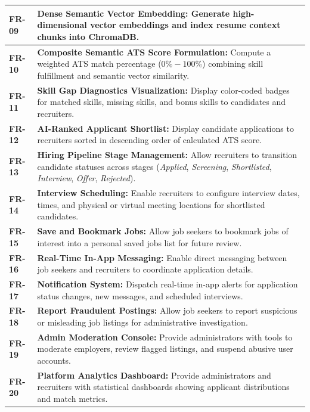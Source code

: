 \begin{table}[H]
\begin{tabular}{|l|p{12cm}|}
\textbf{FR-09} & \textbf{Dense Semantic Vector Embedding:} Generate high-dimensional vector embeddings and index resume context chunks into ChromaDB. \\ \hline
\textbf{FR-10} & \textbf{Composite Semantic ATS Score Formulation:} Compute a weighted ATS match percentage ($0\% - 100\%$) combining skill fulfillment and semantic vector similarity. \\ \hline
\textbf{FR-11} & \textbf{Skill Gap Diagnostics Visualization:} Display color-coded badges for matched skills, missing skills, and bonus skills to candidates and recruiters. \\ \hline
\textbf{FR-12} & \textbf{AI-Ranked Applicant Shortlist:} Display candidate applications to recruiters sorted in descending order of calculated ATS score. \\ \hline
\textbf{FR-13} & \textbf{Hiring Pipeline Stage Management:} Allow recruiters to transition candidate statuses across stages (\textit{Applied}, \textit{Screening}, \textit{Shortlisted}, \textit{Interview}, \textit{Offer}, \textit{Rejected}). \\ \hline
\textbf{FR-14} & \textbf{Interview Scheduling:} Enable recruiters to configure interview dates, times, and physical or virtual meeting locations for shortlisted candidates. \\ \hline
\textbf{FR-15} & \textbf{Save and Bookmark Jobs:} Allow job seekers to bookmark jobs of interest into a personal saved jobs list for future review. \\ \hline
\textbf{FR-16} & \textbf{Real-Time In-App Messaging:} Enable direct messaging between job seekers and recruiters to coordinate application details. \\ \hline
\textbf{FR-17} & \textbf{Notification System:} Dispatch real-time in-app alerts for application status changes, new messages, and scheduled interviews. \\ \hline
\textbf{FR-18} & \textbf{Report Fraudulent Postings:} Allow job seekers to report suspicious or misleading job listings for administrative investigation. \\ \hline
\textbf{FR-19} & \textbf{Admin Moderation Console:} Provide administrators with tools to moderate employers, review flagged listings, and suspend abusive user accounts. \\ \hline
\textbf{FR-20} & \textbf{Platform Analytics Dashboard:} Provide administrators and recruiters with statistical dashboards showing applicant distributions and match metrics. \\ \hline

\end{tabular}
\end{table}
